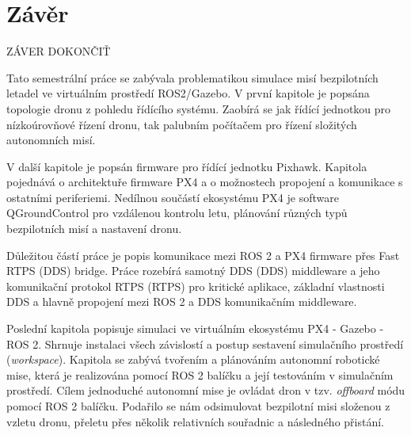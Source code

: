 \chapter*{Závěr}
{}

ZÁVER DOKONČIŤ

Tato semestrální práce se zabývala problematikou simulace misí bezpilotních letadel ve virtuálním prostředí ROS2/Gazebo. V první kapitole je popsána topologie dronu z pohledu řídícího systému. Zaobírá se jak řídící jednotkou pro nízkoúrovňové řízení dronu, tak palubním počítačem pro řízení složitých autonomních misí.

V další kapitole je popsán firmware pro řídící jednotku Pixhawk. Kapitola pojednává o architektuře firmware PX4 a o možnostech propojení a komunikace s ostatními periferiemi. Nedílnou součástí ekosystému PX4 je software QGroundControl pro vzdálenou kontrolu letu, plánování různých typů bezpilotních misí a nastavení dronu.

Důležitou částí práce je popis komunikace mezi ROS 2 a PX4 firmware přes Fast RTPS (\acs{DDS}) bridge. Práce rozebírá samotný \acs{DDS} (\acl{DDS}) middleware a jeho komunikační protokol \acs{RTPS} (\acl{RTPS}) pro kritické aplikace, základní vlastnosti \acs{DDS} a hlavně propojení mezi ROS 2 a \acs{DDS} komunikačním middleware.

Poslední kapitola popisuje simulaci ve virtuálním ekosystému PX4 - Gazebo - ROS 2. Shrnuje instalaci všech závislostí a postup sestavení simulačního prostředí (\textit{workspace}). Kapitola se zabývá tvořením a plánováním autonomní robotické mise, která je realizována pomocí ROS 2 balíčku a její testováním v simulačním prostředí. Cílem jednoduché autonomní mise je ovládat dron v tzv. \textit{offboard} módu pomocí ROS 2 balíčku. Podařilo se nám odsimulovat bezpilotní misi složenou z vzletu dronu, přeletu přes několik relativních souřadnic a následného přistání.


